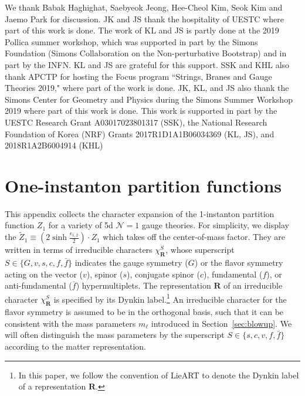 \documentclass[letterpaper, 11pt]{article}
\def\e{\epsilon}
\begin{document}
{\acknowledgments
We thank Babak Haghighat, Saebyeok Jeong, Hee-Cheol Kim, Seok Kim and Jaemo Park for discussion. 
JK and JS thank the hospitality of UESTC where part of this work is done. 
The work of KL and JS is partly done at the 2019 Pollica summer workshop, which was supported in part by the Simons Foundation (Simons Collaboration on the Non-perturbative Bootstrap) and in part by the INFN. KL and JS are grateful for this support.
SSK and KHL also thank APCTP for hosting the Focus program ``Strings, Branes and Gauge Theories 2019," where part of the work is done.
JK, KL, and JS also thank the Simons Center for Geometry and Physics during the Simons Summer Workshop 2019 where part of this work is done. 
This work is supported in part by the UESTC Research Grant A03017023801317 (SSK), the National Research Foundation of Korea (NRF) Grants 2017R1D1A1B06034369 (KL, JS), and 2018R1A2B6004914 (KHL)


\appendix
\section{One-instanton partition functions}
\label{sec:data}

This appendix collects the character expansion of the 1-instanton partition function $Z_1$ for a variety of 5d $\mathcal{N}=1$ gauge theories. For simplicity, we display the $\tilde{Z}_1 \equiv (2\sinh{\frac{\e_{1,2}}{2}}) \cdot Z_1$ which takes off the center-of-mass factor. They are written in terms of irreducible characters $\chi_{\mathbf{R}}^S$, whose superscript $S \in \{G,v,s,c,f,\bar{f}\}$ indicates the gauge symmetry ($G$) or the flavor symmetry acting on the vector ($v$), spinor ($s$), conjugate spinor ($c$), fundamental ($f$), or anti-fundamental ($\bar{f}$) hypermultiplets. The representation $\mathbf{R}$ of an irreducible character $\chi_{\mathbf{R}}^S$ is specified by its Dynkin label.\footnote{In this paper, we follow the convention of  LieART \cite{Feger:2012bs} to denote the Dynkin label of a representation $\mathbf{R}$.} An irreducible character for the flavor symmetry is assumed to be in the orthogonal basis, such that it can be consistent with the mass parameters $m_\ell$ introduced in Section~\ref{sec:blowup}. We will often distinguish the mass parameters by the superscript $S \in \{s,c,v,f,\bar{f}\}$ according to the matter representation. 

}
\end{document}

